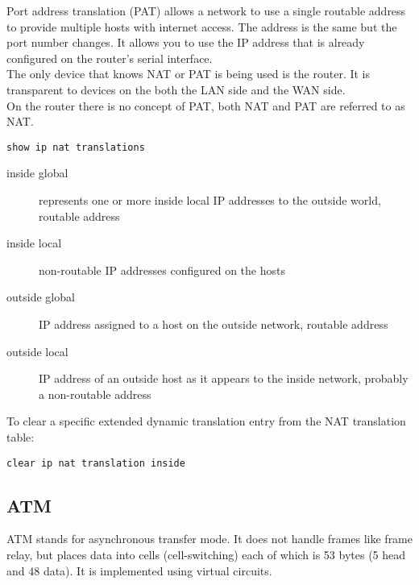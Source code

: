 Port address translation (PAT) allows a network to use a single routable
address to provide multiple hosts with internet access. The address is the
same but the port number changes. It allows you to use the IP address that is
already configured on the router's serial interface.\\

The only device that knows NAT or PAT is being used is the router. It
is transparent to devices on the both the LAN side and the WAN side.\\

On the router there is no concept of PAT, both NAT and PAT are referred to
as NAT.

\begin{verbatim}
show ip nat translations
\end{verbatim}

\begin{description}

\item[inside global]
represents one or more inside local IP addresses to the outside world, routable
address

\item[inside local]
non-routable IP addresses configured on the hosts

\item[outside global]
IP address assigned to a host on the outside network, routable address

\item[outside local]
IP address of an outside host as it appears to the inside network, probably
a non-routable address

\end{description}

To clear a specific extended dynamic translation entry from the NAT translation
table:

\begin{verbatim}
clear ip nat translation inside
\end{verbatim}

\subsection{ATM}

ATM stands for asynchronous transfer mode. It does not handle frames like
frame relay, but places data into cells (cell-switching) each of which is 53
bytes (5 head and 48 data). It is implemented using virtual circuits.\\

